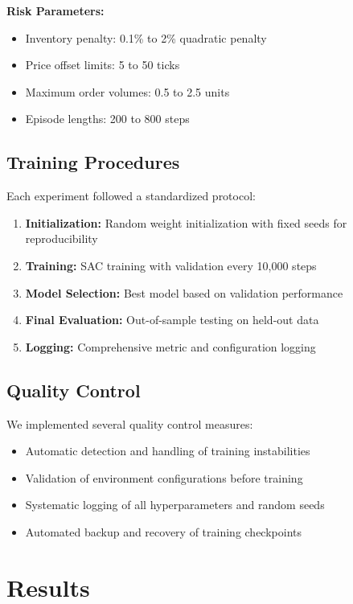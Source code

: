 \documentclass[conference]{IEEEtran}
\begin{document}
\textbf{Risk Parameters:}
\begin{itemize}
\item Inventory penalty: 0.1\% to 2\% quadratic penalty
\item Price offset limits: 5 to 50 ticks
\item Maximum order volumes: 0.5 to 2.5 units
\item Episode lengths: 200 to 800 steps
\end{itemize}

\subsection{Training Procedures}

Each experiment followed a standardized protocol:

\begin{enumerate}
\item \textbf{Initialization:} Random weight initialization with fixed seeds for reproducibility
\item \textbf{Training:} SAC training with validation every 10,000 steps
\item \textbf{Model Selection:} Best model based on validation performance
\item \textbf{Final Evaluation:} Out-of-sample testing on held-out data
\item \textbf{Logging:} Comprehensive metric and configuration logging
\end{enumerate}

\subsection{Quality Control}

We implemented several quality control measures:
\begin{itemize}
\item Automatic detection and handling of training instabilities
\item Validation of environment configurations before training
\item Systematic logging of all hyperparameters and random seeds
\item Automated backup and recovery of training checkpoints
\end{itemize}



\section{Results}
\end{document}
